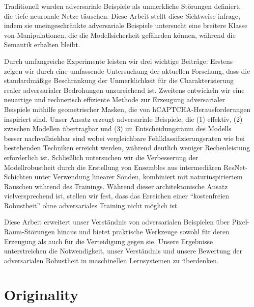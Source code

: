 \documentclass[a4paper, oneside]{discothesis}
\begin{document}
\begin{zusammenfassung}
	Traditionell wurden adversariale Beispiele als unmerkliche Störungen definiert, die tiefe neuronale Netze täuschen. Diese Arbeit stellt diese Sichtweise infrage, indem sie uneingeschränkte adversariale Beispiele untersucht \textendash{} eine breitere Klasse von Manipulationen, die die Modellsicherheit gefährden können, während die Semantik erhalten bleibt.

	Durch umfangreiche Experimente leisten wir drei wichtige Beiträge: Erstens zeigen wir durch eine umfassende Untersuchung der aktuellen Forschung, dass die standardmäßige Beschränkung der Unmerklichkeit für die Charakterisierung realer adversarialer Bedrohungen unzureichend ist. Zweitens entwickeln wir eine neuartige und rechnerisch effiziente Methode zur Erzeugung adversarialer Beispiele mithilfe geometrischer Masken, die von hCAPTCHA-Herausforderungen inspiriert sind. Unser Ansatz erzeugt adversariale Beispiele, die (1) effektiv, (2) zwischen Modellen übertragbar und (3) im Entscheidungsraum des Modells besser nachvollziehbar sind \textendash{} wobei vergleichbare Fehlklassifizierungsraten wie bei bestehenden Techniken erreicht werden, während deutlich weniger Rechenleistung erforderlich ist. Schließlich untersuchen wir die Verbesserung der Modellrobustheit durch die Erstellung von Ensembles aus intermediären ResNet-Schichten unter Verwendung linearer Sonden, kombiniert mit naturinspiriertem Rauschen während des Trainings. Während dieser architektonische Ansatz vielversprechend ist, stellen wir fest, dass das Erreichen einer ``kostenfreien Robustheit'' ohne adversariales Training nicht möglich ist.

	Diese Arbeit erweitert unser Verständnis von adversarialen Beispielen über Pixel-Raum-Störungen hinaus und bietet praktische Werkzeuge sowohl für deren Erzeugung als auch für die Verteidigung gegen sie. Unsere Ergebnisse unterstreichen die Notwendigkeit, unser Verständnis und unsere Bewertung der adversarialen Robustheit in maschinellen Lernsystemen zu überdenken.
\end{zusammenfassung}

\chapter*{Originality}

\end{document}
